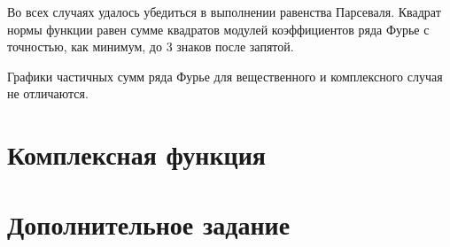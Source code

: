 Во всех случаях удалось убедиться в выполнении равенства Парсеваля. Квадрат нормы функции равен сумме квадратов модулей коэффициентов ряда Фурье с точностью, как минимум, до 3 знаков после запятой.

Графики частичных сумм ряда Фурье для вещественного и комплексного случая не отличаются. 
\FloatBarrier

\section{Комплексная функция}

\clearpage

\section{Дополнительное задание}

